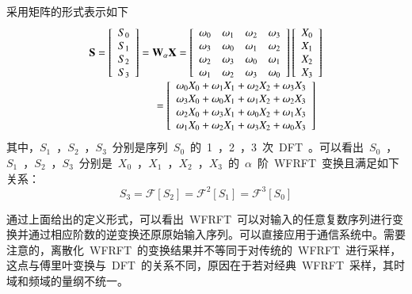 采用矩阵的形式表示如下
\begin{equation}
  \begin{array}{l}
  {\bf{S}} = \left[ \begin{array}{l}
  {S_0}\\
  {S_1}\\
  {S_2}\\
  {S_3}
  \end{array} \right] = {{\bf{W}}_\alpha }{\bf{X}} = \left[ {\begin{array}{*{20}{c}}
  {{\omega _0}}&{{\omega _1}}&{{\omega _2}}&{{\omega _3}}\\
  {{\omega _3}}&{{\omega _0}}&{{\omega _1}}&{{\omega _2}}\\
  {{\omega _2}}&{{\omega _3}}&{{\omega _0}}&{{\omega _1}}\\
  {{\omega _1}}&{{\omega _2}}&{{\omega _3}}&{{\omega _0}}
  \end{array}} \right]\left[ \begin{array}{l}
  {X_0}\\
  {X_1}\\
  {X_2}\\
  {X_3}
  \end{array} \right]\\
  \;\;\;\;\;\;\;\;\;\;\;\;\;\;\;\;\;\;\;\;\;\; = \left[ {\begin{array}{*{20}{c}}
  {{\omega _0}{X_0} + {\omega _1}{X_1} + {\omega _2}{X_2} + {\omega _3}{X_3}}\\
  {{\omega _3}{X_0} + {\omega _0}{X_1} + {\omega _1}{X_2} + {\omega _2}{X_3}}\\
  {{\omega _2}{X_0} + {\omega _3}{X_1} + {\omega _0}{X_2} + {\omega _1}{X_3}}\\
  {{\omega _1}{X_0} + {\omega _2}{X_1} + {\omega _3}{X_2} + {\omega _0}{X_3}}
  \end{array}} \right]
  \end{array}
\end{equation}
其中，${S_1}$~，${S_2}$~，${S_3}$~分别是序列~${S_0}$~的~1~，2~，3~次~DFT~。可以看出~${S_0}$~，${S_1}$~，${S_2}$~，${S_3}$~分别是~${X_0}$~，${X_1}$~，${X_2}$~，${X_3}$~的~$\alpha$~阶~WFRFT~变换且满足如下关系：
\begin{equation}
{S_3} = \mathcal{F}[{S_2}] = {\mathcal{F}^2}[{S_1}] = {\mathcal{F}^3}[{S_0}]
\end{equation}

通过上面给出的定义形式，可以看出~WFRFT~可以对输入的任意复数序列进行变换并通过相应阶数的逆变换还原原始输入序列。可以直接应用于通信系统中。需要注意的，离散化~WFRFT~的变换结果并不等同于对传统的~WFRFT~进行采样，这点与傅里叶变换与~DFT~的关系不同，原因在于若对经典~WFRFT~采样，其时域和频域的量纲不统一。

